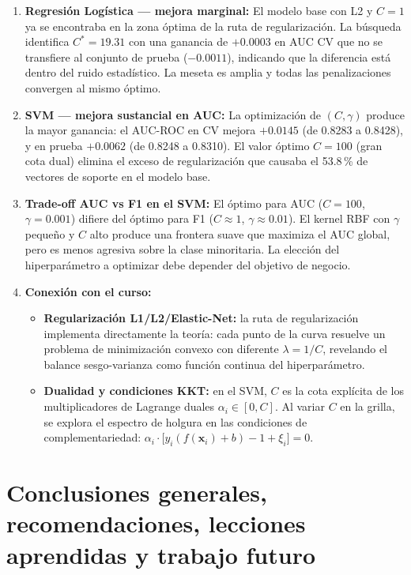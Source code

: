 \documentclass[spanish]{article}
\begin{document}
\begin{enumerate}
    \item \textbf{Regresión Logística — mejora marginal:} El modelo base con L2 y $C=1$ ya se encontraba en la zona óptima de la ruta de regularización. La búsqueda identifica $C^* = 19.31$ con una ganancia de $+0.0003$ en AUC CV que no se transfiere al conjunto de prueba ($-0.0011$), indicando que la diferencia está dentro del ruido estadístico. La meseta es amplia y todas las penalizaciones convergen al mismo óptimo.

    \item \textbf{SVM — mejora sustancial en AUC:} La optimización de $(C, \gamma)$ produce la mayor ganancia: el AUC-ROC en CV mejora $+0.0145$ (de 0.8283 a 0.8428), y en prueba $+0.0062$ (de 0.8248 a 0.8310). El valor óptimo $C=100$ (gran cota dual) elimina el exceso de regularización que causaba el 53.8\,\% de vectores de soporte en el modelo base.

    \item \textbf{Trade-off AUC vs F1 en el SVM:} El óptimo para AUC ($C=100$, $\gamma=0.001$) difiere del óptimo para F1 ($C \approx 1$, $\gamma \approx 0.01$). El kernel RBF con $\gamma$ pequeño y $C$ alto produce una frontera suave que maximiza el AUC global, pero es menos agresiva sobre la clase minoritaria. La elección del hiperparámetro a optimizar debe depender del objetivo de negocio.

    \item \textbf{Conexión con el curso:}
    \begin{itemize}
        \item \textbf{Regularización L1/L2/Elastic-Net:} la ruta de regularización implementa directamente la teoría: cada punto de la curva resuelve un problema de minimización convexo con diferente $\lambda = 1/C$, revelando el balance sesgo-varianza como función continua del hiperparámetro.
        \item \textbf{Dualidad y condiciones KKT:} en el SVM, $C$ es la cota explícita de los multiplicadores de Lagrange duales $\alpha_i \in [0, C]$. Al variar $C$ en la grilla, se explora el espectro de holgura en las condiciones de complementariedad: $\alpha_i \cdot \bigl[y_i(f(\mathbf{x}_i)+b) - 1 + \xi_i\bigr] = 0$.
    \end{itemize}
\end{enumerate}

\section{Conclusiones generales, recomendaciones, lecciones aprendidas y trabajo futuro}
\end{document}
